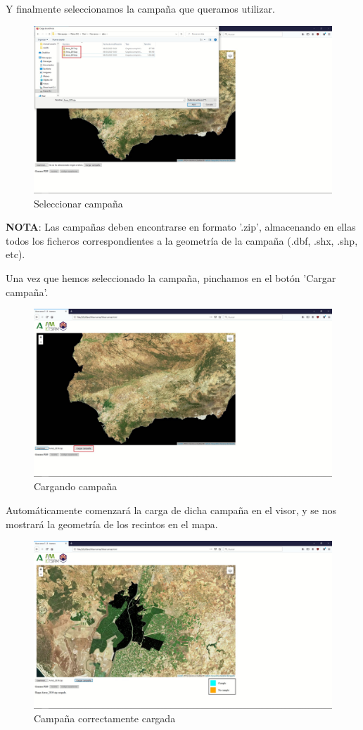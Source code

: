 \documentclass{article}
\begin{document}
Y finalmente seleccionamos la campaña que queramos utilizar.

\begin{figure}[H]
	\centering
	\includegraphics[width=0.8\linewidth]{localizar.jpg}
	\caption{Seleccionar campaña}
	\label{fig:localizar}
\end{figure}


\textbf{NOTA}: Las campañas deben encontrarse en formato '.zip', almacenando en ellas todos los ficheros correspondientes a la geometría de la campaña (.dbf, .shx, .shp, etc).\newline

Una vez que hemos seleccionado la campaña, pinchamos en el botón 'Cargar campaña'.

\begin{figure}[H]
	\centering
	\includegraphics[width=0.8\linewidth]{cargar_campana.jpg}
	\caption{Cargando campaña}
	\label{fig:cargar_campana}
\end{figure}

Automáticamente comenzará la carga de dicha campaña en el visor, y se nos mostrará la geometría de los recintos en el mapa.

\begin{figure}[H]
	\centering
	\includegraphics[width=0.8\linewidth]{campana_cargada.jpg}
	\caption{Campaña correctamente cargada}
	\label{fig:campana_cargada}
\end{figure}
\end{document}
